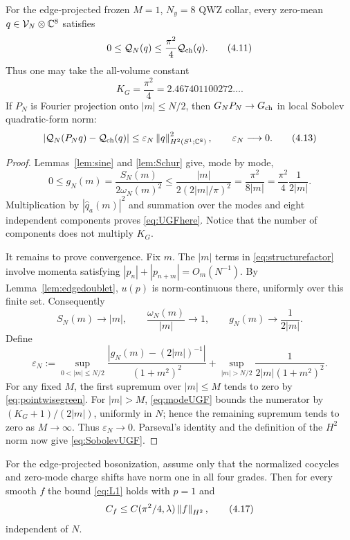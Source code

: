 \begin{theorem}
\label{thm:UGF}
For the edge-projected frozen $M=1$, $N_y=8$ QWZ collar, every
zero-mean $q\in\mathcal V_N\otimes\mathbb C^8$ satisfies
\[
 0\le\mathcal Q_N(q)
 \le\frac{\pi^2}{4}\mathcal Q_{\rm ch}(q).
\tag{4.11}\label{eq:UGFhere}
\]
Thus one may take the all-volume constant
\[
 K_G=\frac{\pi^2}{4}=2.467401100272\ldots .
\tag{4.12}\label{eq:KG}
\]
If $P_N$ is Fourier projection onto $|m|\le N/2$, then
$G_NP_N\to G_{\rm ch}$ in local Sobolev quadratic-form norm:
\[
 \left|\mathcal Q_N(P_Nq)-\mathcal Q_{\rm ch}(q)\right|
 \le\varepsilon_N\left\lVert q\right\rVert_{H^2(S^1;\mathbb C^8)}^2,
 \qquad\varepsilon_N\longrightarrow0.
\tag{4.13}\label{eq:SobolevUGF}
\]
\end{theorem}

\begin{proof}
Lemmas~\ref{lem:sine} and \ref{lem:Schur} give, mode by mode,
\[
 0\le g_N(m)
 =\frac{S_N(m)}{2\omega_N(m)^2}
 \le\frac{|m|}{2(2|m|/\pi)^2}
 =\frac{\pi^2}{8|m|}
 =\frac{\pi^2}{4}\frac1{2|m|}.
\tag{4.14}\label{eq:modeUGF}
\]
Multiplication by $|\widehat q_a(m)|^2$ and summation over the modes and
eight independent components proves \eqref{eq:UGFhere}.  Notice that
the number of components does not multiply $K_G$.

It remains to prove convergence.  Fix $m$.  The $|m|$ terms in
\eqref{eq:structurefactor} involve momenta satisfying
$|p_n|+|p_{n+m}|=O_m(N^{-1})$.  By
Lemma~\ref{lem:edgedoublet}, $u(p)$ is norm-continuous there, uniformly
over this finite set.  Consequently
\[
 S_N(m)\longrightarrow |m|,
\qquad
 \frac{\omega_N(m)}{|m|}\longrightarrow1,
\qquad
 g_N(m)\longrightarrow\frac1{2|m|}.
\tag{4.15}\label{eq:pointwisegreen}
\]
Define
\[
 \varepsilon_N:=
 \sup_{0<|m|\le N/2}
 \frac{|g_N(m)-(2|m|)^{-1}|}{(1+m^2)^2}
 +\sup_{|m|>N/2}\frac{1}{2|m|(1+m^2)^2}.
\tag{4.16}\label{eq:epsilonN}
\]
For any fixed $M$, the first supremum over $|m|\le M$ tends to zero by
\eqref{eq:pointwisegreen}.  For $|m|>M$,
\eqref{eq:modeUGF} bounds the numerator by
$(K_G+1)/(2|m|)$, uniformly in $N$; hence the remaining supremum tends
to zero as $M\to\infty$.  Thus $\varepsilon_N\to0$.  Parseval's identity
and the definition of the $H^2$ norm now give
\eqref{eq:SobolevUGF}.
\end{proof}

\begin{theorem}
\label{thm:L1reduction}
For the edge-projected bosonization, assume only that the normalized
cocycles and zero-mode charge shifts have norm one in all four grades.
Then for every smooth $f$ the bound \eqref{eq:L1} holds with $p=1$ and
\[
 C_f\le C(\pi^2/4,\lambda)\left\lVert f\right\rVert_{H^2},
\tag{4.17}\label{eq:Cf}
\]
independent of $N$.
\end{theorem}

